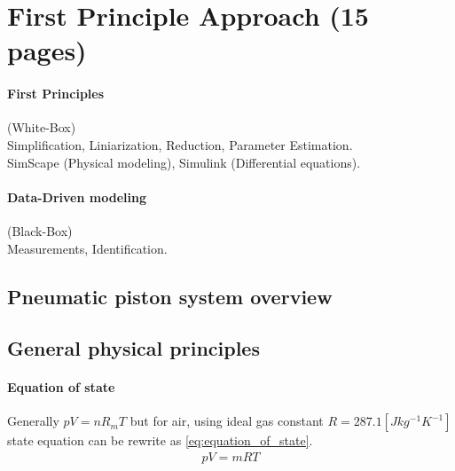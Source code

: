\documentclass[class=article, crop=false]{standalone}
\begin{document}
\tableofcontents

\section{First Principle Approach (15 pages)}
\paragraph{First Principles} (White-Box) \\
Simplification, Liniarization, Reduction, Parameter Estimation. \\
SimScape (Physical modeling), Simulink (Differential equations).

\paragraph{Data-Driven modeling}(Black-Box) \\ %
Measurements, Identification.


\subsection{Pneumatic piston system overview}







\subsection{General physical principles}
\paragraph{Equation of state}
Generally $pV=nR_mT$ but for air, using ideal gas constant $R=287.1 [Jkg^{-1}K^{-1}]$
state equation can be rewrite as \ref{eq:equation_of_state}.
\begin{align}
    pV = mRT
    \label{eq:equation_of_state}
\end{align} 
\end{document}
